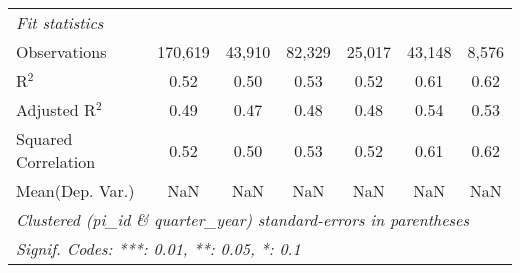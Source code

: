 \begin{tabular}{lcccccc}
   \midrule
   \emph{Fit statistics}\\
   Observations                                               & 170,619      & 43,910        & 82,329      & 25,017        & 43,148       & 8,576\\  
   R$^2$                                                      & 0.52         & 0.50          & 0.53        & 0.52          & 0.61         & 0.62\\  
   Adjusted R$^2$                                             & 0.49         & 0.47          & 0.48        & 0.48          & 0.54         & 0.53\\  
   Squared Correlation                                        & 0.52         & 0.50          & 0.53        & 0.52          & 0.61         & 0.62\\  
Mean(Dep. Var.) & NaN & NaN & NaN & NaN & NaN & NaN \\
   \midrule \midrule
   \multicolumn{7}{l}{\emph{Clustered (pi\_id \& quarter\_year) standard-errors in parentheses}}\\
   \multicolumn{7}{l}{\emph{Signif. Codes: ***: 0.01, **: 0.05, *: 0.1}}\\
\end{tabular}
\par\endgroup
